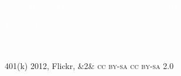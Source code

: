 \documentclass[t,handout]{beamer}  %
\newcommand{\ccby}[1]{%
	\ifx&#1&
	{\textsc{cc by}}%
\else
	{\textsc{cc by #1.0}}
\fi}
\newcommand{\ccbysa}[1]{%
	\ifx&#1&
	{\textsc{cc by-sa}}%
\else
	{\textsc{cc by-sa #1.0}} 
\fi}
\begin{document}
{
\begin{frame}[b]
\hfill\textcolor{white}{\tiny Guido Bohne, Flickr \ccbysa{2}}
\end{frame}
}
%
{
\begin{frame}[b]
\textcolor{white}{\tiny Michael S. Taylor, \ccbysa{4}}
\end{frame}
}
%
{
\begin{frame}[b]
\hfill\textcolor{white}{\tiny Ian Carroll, Flickr, \ccby{2}}
\end{frame}
}
%
{
\begin{frame}[b]
\hfill\tiny 401(k) 2012, Flickr, \ccbysa{2}
\end{frame}
}
%
{
\begin{frame}[b]
\end{frame}
}
%

\end{document}

